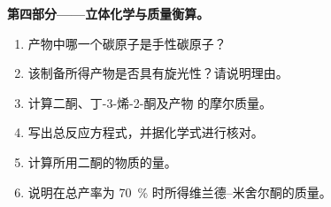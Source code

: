 \begin{problem}
\medskip
\noindent\textbf{第四部分——立体化学与质量衡算。}
\begin{enumerate}[resume]
  \item 产物中哪一个碳原子是手性碳原子？
  \item 该制备所得产物是否具有旋光性？请说明理由。
  \item 计算二酮、丁-3-烯-2-酮及产物
         的摩尔质量。
  \item 写出总反应方程式，并据化学式进行核对。
  \item 计算所用二酮的物质的量。
  \item 说明在总产率为 70~\% 时所得维兰德–米舍尔酮的质量。
\end{enumerate}
\end{problem}
